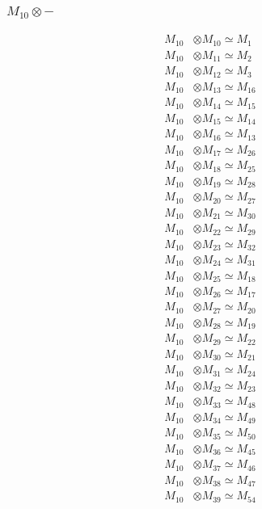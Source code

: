 \subsubsection{$ M_{10}\otimes -$}
\begin{align*}
M_{10} &\otimes M_{10} \simeq M_{1} \\
M_{10} &\otimes M_{11} \simeq M_{2} \\
M_{10} &\otimes M_{12} \simeq M_{3} \\
M_{10} &\otimes M_{13} \simeq M_{16} \\
M_{10} &\otimes M_{14} \simeq M_{15} \\
M_{10} &\otimes M_{15} \simeq M_{14} \\
M_{10} &\otimes M_{16} \simeq M_{13} \\
M_{10} &\otimes M_{17} \simeq M_{26} \\
M_{10} &\otimes M_{18} \simeq M_{25} \\
M_{10} &\otimes M_{19} \simeq M_{28} \\
M_{10} &\otimes M_{20} \simeq M_{27} \\
M_{10} &\otimes M_{21} \simeq M_{30} \\
M_{10} &\otimes M_{22} \simeq M_{29} \\
M_{10} &\otimes M_{23} \simeq M_{32} \\
M_{10} &\otimes M_{24} \simeq M_{31} \\
M_{10} &\otimes M_{25} \simeq M_{18} \\
M_{10} &\otimes M_{26} \simeq M_{17} \\
M_{10} &\otimes M_{27} \simeq M_{20} \\
M_{10} &\otimes M_{28} \simeq M_{19} \\
M_{10} &\otimes M_{29} \simeq M_{22} \\
M_{10} &\otimes M_{30} \simeq M_{21} \\
M_{10} &\otimes M_{31} \simeq M_{24} \\
M_{10} &\otimes M_{32} \simeq M_{23} \\
M_{10} &\otimes M_{33} \simeq M_{48} \\
M_{10} &\otimes M_{34} \simeq M_{49} \\
M_{10} &\otimes M_{35} \simeq M_{50} \\
M_{10} &\otimes M_{36} \simeq M_{45} \\
M_{10} &\otimes M_{37} \simeq M_{46} \\
M_{10} &\otimes M_{38} \simeq M_{47} \\
M_{10} &\otimes M_{39} \simeq M_{54} \\

\end{align*}
